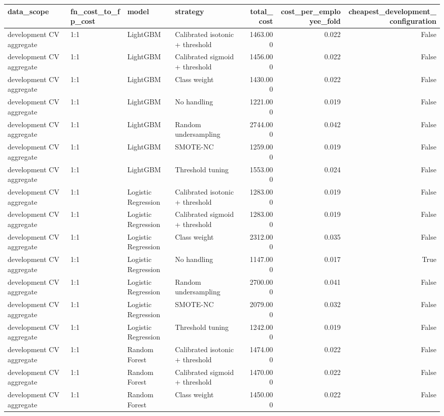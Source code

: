 \begin{tabular}{llllrrr}
\toprule
data_scope & fn_cost_to_fp_cost & model & strategy & total_cost & cost_per_employee_fold & cheapest_development_configuration \\
\midrule
development CV aggregate & 1:1 & LightGBM & Calibrated isotonic + threshold & 1463.000 & 0.022 & False \\
development CV aggregate & 1:1 & LightGBM & Calibrated sigmoid + threshold & 1456.000 & 0.022 & False \\
development CV aggregate & 1:1 & LightGBM & Class weight & 1430.000 & 0.022 & False \\
development CV aggregate & 1:1 & LightGBM & No handling & 1221.000 & 0.019 & False \\
development CV aggregate & 1:1 & LightGBM & Random undersampling & 2744.000 & 0.042 & False \\
development CV aggregate & 1:1 & LightGBM & SMOTE-NC & 1259.000 & 0.019 & False \\
development CV aggregate & 1:1 & LightGBM & Threshold tuning & 1553.000 & 0.024 & False \\
development CV aggregate & 1:1 & Logistic Regression & Calibrated isotonic + threshold & 1283.000 & 0.019 & False \\
development CV aggregate & 1:1 & Logistic Regression & Calibrated sigmoid + threshold & 1283.000 & 0.019 & False \\
development CV aggregate & 1:1 & Logistic Regression & Class weight & 2312.000 & 0.035 & False \\
development CV aggregate & 1:1 & Logistic Regression & No handling & 1147.000 & 0.017 & True \\
development CV aggregate & 1:1 & Logistic Regression & Random undersampling & 2700.000 & 0.041 & False \\
development CV aggregate & 1:1 & Logistic Regression & SMOTE-NC & 2079.000 & 0.032 & False \\
development CV aggregate & 1:1 & Logistic Regression & Threshold tuning & 1242.000 & 0.019 & False \\
development CV aggregate & 1:1 & Random Forest & Calibrated isotonic + threshold & 1474.000 & 0.022 & False \\
development CV aggregate & 1:1 & Random Forest & Calibrated sigmoid + threshold & 1470.000 & 0.022 & False \\
development CV aggregate & 1:1 & Random Forest & Class weight & 1450.000 & 0.022 & False \\

\end{tabular}
